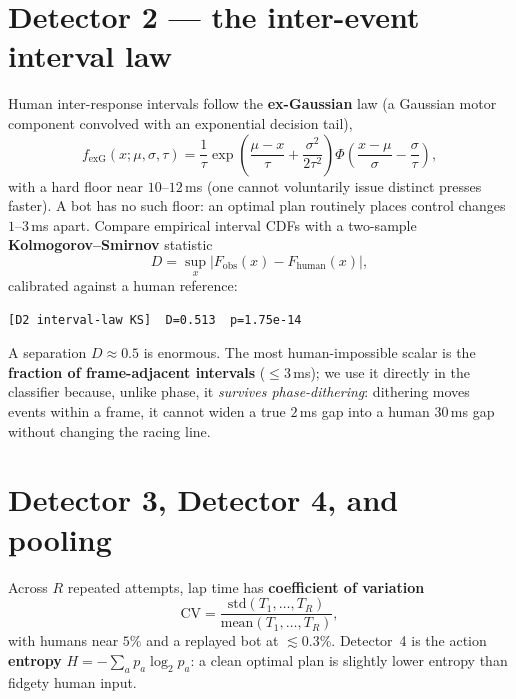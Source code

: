 \documentclass[11pt]{article}
\begin{document}
\section{Detector 2 --- the inter-event interval law}

Human inter-response intervals follow the \textbf{ex-Gaussian} law (a Gaussian
motor component convolved with an exponential decision tail),
\begin{equation}
f_{\text{exG}}(x;\mu,\sigma,\tau)=\frac{1}{\tau}
\exp\!\left(\frac{\mu-x}{\tau}+\frac{\sigma^2}{2\tau^2}\right)
\Phi\!\left(\frac{x-\mu}{\sigma}-\frac{\sigma}{\tau}\right),
\end{equation}
with a hard floor near $10$--$12$\,ms (one cannot voluntarily issue distinct
presses faster). A bot has no such floor: an optimal plan routinely places
control changes $1$--$3$\,ms apart. Compare empirical interval CDFs with a
two-sample \textbf{Kolmogorov--Smirnov} statistic
\begin{equation}
D = \sup_x \left| F_{\text{obs}}(x) - F_{\text{human}}(x) \right|,
\end{equation}
calibrated against a human reference:
\begin{lstlisting}[style=out]
[D2 interval-law KS]  D=0.513  p=1.75e-14
\end{lstlisting}
A separation $D\approx0.5$ is enormous. The most human-impossible scalar is the
\textbf{fraction of frame-adjacent intervals} ($\le 3$\,ms); we use it directly
in the classifier because, unlike phase, it \emph{survives phase-dithering}:
dithering moves events within a frame, it cannot widen a true $2$\,ms gap into a
human $30$\,ms gap without changing the racing line.

\section{Detector 3, Detector 4, and pooling}
\label{sec:pool}

Across $R$ repeated attempts, lap time has \textbf{coefficient of variation}
\begin{equation}
\mathrm{CV} = \frac{\mathrm{std}(T_1,\dots,T_R)}{\mathrm{mean}(T_1,\dots,T_R)},
\end{equation}
with humans near $5\%$ and a replayed bot at $\lesssim 0.3\%$. Detector~4 is the
action \textbf{entropy} $H=-\sum_a p_a\log_2 p_a$: a clean optimal plan is
slightly lower entropy than fidgety human input.
\end{document}
